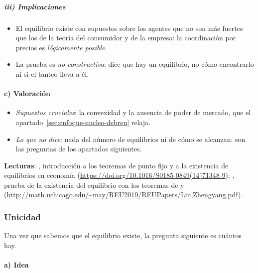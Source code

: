 \documentclass[11pt]{article}
\begin{document}
\subparagraph{iii) Implicaciones}

\begin{itemize}
\item El equilibrio existe con supuestos sobre los agentes que no son más fuertes que los de la teoría del consumidor y de la empresa: la coordinación por precios es \emph{lógicamente posible}.
\item La prueba es \emph{no constructiva}: dice que hay un equilibrio, no cómo encontrarlo ni si el tanteo lleva a él.
\end{itemize}

\paragraph{c) Valoración}

\begin{itemize}
\item \emph{Supuestos cruciales}: la convexidad y la ausencia de poder de mercado, que el apartado~\ref{sec:enfoque-nucleo-debreu} relaja.
\item \emph{Lo que no dice}: nada del número de equilibrios ni de cómo se alcanzan: son las preguntas de los apartados siguientes.
\end{itemize}

\begin{anotaciones}
\textbf{Lecturas}: \textcite{DelgadoToral2014Introduccion}, introducción a los teoremas de punto fijo y a la existencia de equilibrios en economía (\url{https://doi.org/10.1016/S0185-0849(14)71348-9}); \textcite{Liu2019Fixed}, prueba de la existencia del equilibrio con los teoremas de  y  (\url{http://math.uchicago.edu/~may/REU2019/REUPapers/Liu,Zhengyang.pdf}).
\end{anotaciones}

\subsubsection{Unicidad}\label{sec:unicidad}

Una vez que sabemos que el equilibrio existe, la pregunta siguiente es cuántos hay.

\paragraph{a) Idea}
\end{document}
